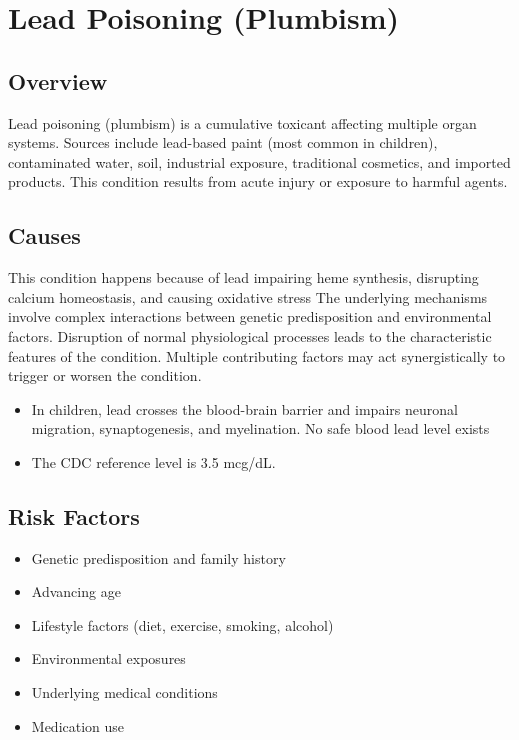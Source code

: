 \chapter{Lead Poisoning (Plumbism)}
\label{sec:Lead Poisoning}

\section{Overview}
Lead poisoning (plumbism) is a cumulative toxicant affecting multiple organ systems. Sources include lead-based paint (most common in children), contaminated water, soil, industrial exposure, traditional cosmetics, and imported products. This condition results from acute injury or exposure to harmful agents.
\section{Causes}
This condition happens because of lead impairing heme synthesis, disrupting calcium homeostasis, and causing oxidative stress The underlying mechanisms involve complex interactions between genetic predisposition and environmental factors. Disruption of normal physiological processes leads to the characteristic features of the condition. Multiple contributing factors may act synergistically to trigger or worsen the condition.

\begin{itemize}[noitemsep]
  \item In children, lead crosses the blood-brain barrier and impairs neuronal migration, synaptogenesis, and myelination. No safe blood lead level exists
  \item The CDC reference level is 3.5 mcg/dL.
\end{itemize}
\section{Risk Factors}


\begin{itemize}[noitemsep]
  \item Genetic predisposition and family history
  \item Advancing age
  \item Lifestyle factors (diet, exercise, smoking, alcohol)
  \item Environmental exposures
  \item Underlying medical conditions
  \item Medication use
\end{itemize}
